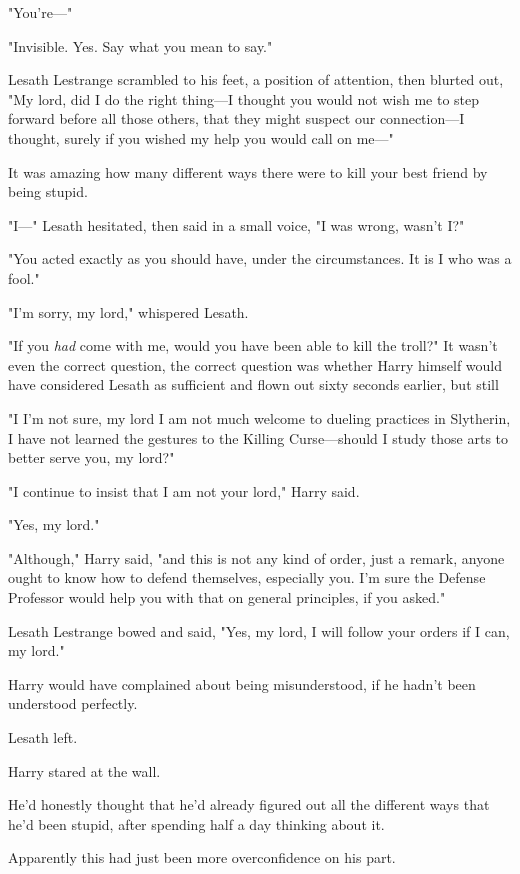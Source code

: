 "You're\mbox{---}"

"Invisible. Yes. Say what you mean to say."

Lesath Lestrange scrambled to his feet, a position of attention, then blurted
out, "My lord, did I do the right thing---I thought you would not wish me to
step forward before all those others, that they might suspect our
connection---I thought, surely if you wished my help you would call on me\mbox{---}"

It was amazing how many different ways there were to kill your best friend by
being stupid.

"I\mbox{---}" Lesath hesitated, then said in a small voice, "I was wrong, wasn't I?"

"You acted exactly as you should have, under the circumstances. It is I who was
a fool."

"I'm sorry, my lord," whispered Lesath.

"If you \emph{had} come with me, would you have been able to kill the troll?"
It wasn't even the correct question, the correct question was whether Harry
himself would have considered Lesath as sufficient and flown out sixty seconds
earlier, but still{\el}

"I{\el} I'm not sure, my lord{\el} I am not much welcome to dueling
practices in Slytherin, I have not learned the gestures to the Killing
Curse---should I study those arts to better serve you, my lord?"

"I continue to insist that I am not your lord," Harry said.

"Yes, my lord."

"Although," Harry said, "and this is not any kind of order, just a remark,
anyone ought to know how to defend themselves, especially you. I'm sure the
Defense Professor would help you with that on general principles, if you asked."

Lesath Lestrange bowed and said, "Yes, my lord, I will follow your orders if I
can, my lord."

Harry would have complained about being misunderstood, if he hadn't been
understood perfectly.

Lesath left.

Harry stared at the wall.

He'd honestly thought that he'd already figured out all the different ways that
he'd been stupid, after spending half a day thinking about it.

Apparently this had just been more overconfidence on his part.


